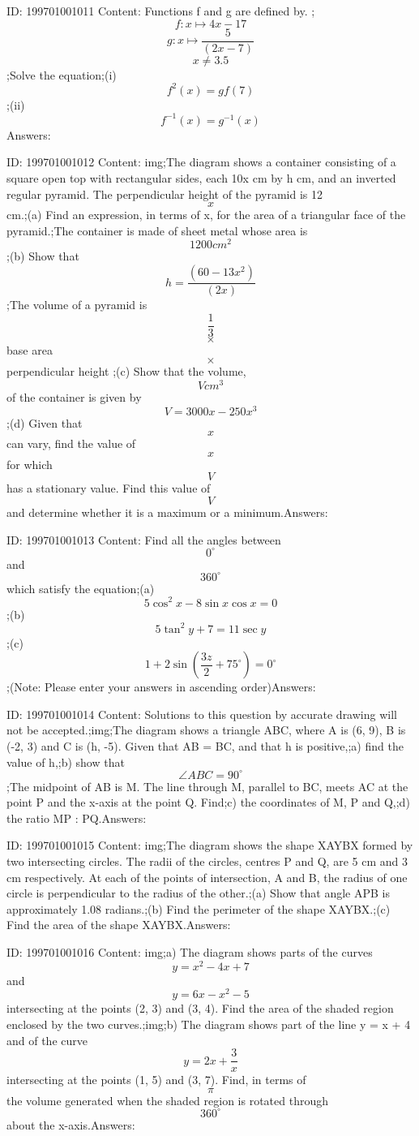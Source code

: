 \documentclass{article}
\begin{document}
ID: 199701001011
Content:
Functions f and g are defined by. ; \[f:x \mapsto  4x-17\] \[g:x \mapsto \frac{5}{(2x-7)} \] \[x\neq 3.5\];Solve the equation;(i) \[f^2(x)=gf(7)\];(ii) \[f^{-1}(x)=g^{-1}(x)\]Answers:

ID: 199701001012
Content:
img;The diagram shows a container consisting of a square open top with rectangular sides, each 10x cm by h cm, and an inverted regular pyramid. The perpendicular height of the pyramid is 12\[x\] cm.;(a)	Find an expression, in terms of x, for the area of a triangular face of the pyramid.;The container is made of sheet metal whose area is \[1200cm^2\];(b)	Show that  \[h=\frac{(60-13x^2)}{(2x)}\];The volume of a pyramid is \[\frac{1}{3}\] \[\times\] base area \[\times\] perpendicular height ;(c)	Show that the volume, \[V cm^3\] of the container is given by \[V=3000x-250x^3\];(d)	Given that \[x\] can vary, find the value of \[x\] for which \[V\] has a stationary value. Find this value of \[V\] and determine whether it is a maximum or a minimum.Answers:

ID: 199701001013
Content:
Find all the angles between \[0^{\circ}\] and \[360^{\circ}\]which satisfy the equation;(a) \[5\cos^2x-8\sin x\cos x=0\] ;(b) \[5\tan^2y+7=11\sec y\];(c) \[1+2\sin(\frac{3z}{2}+75^{\circ})=0^{\circ}\];(Note: Please enter your answers in ascending order)Answers:

ID: 199701001014
Content:
Solutions to this question by accurate drawing will not be accepted.;img;The diagram shows a triangle ABC, where A is (6, 9), B is (-2, 3) and C is (h, -5). Given that AB = BC, and that h is positive,;a)	find the value of h,;b)	show that \[ \angle ABC=90^{\circ}\];The midpoint of AB is M. The line through M, parallel to BC, meets AC at the point P and the x-axis at the point Q. Find;c)	the coordinates of M, P and Q,;d)	the ratio MP : PQ.Answers:

ID: 199701001015
Content:
img;The diagram shows the shape XAYBX formed by two intersecting circles. The radii of the circles, centres P and Q, are 5 cm and 3 cm respectively. At each of the points of intersection, A and B, the radius of one circle is perpendicular to the radius of the other.;(a)	Show that angle APB is approximately 1.08 radians.;(b)	Find the perimeter of the shape XAYBX.;(c)	Find the area of the shape XAYBX.Answers:

ID: 199701001016
Content:
img;a) The diagram shows parts of the curves \[y=x^2-4x+7\]  and \[y=6x-x^2-5\] intersecting at the points (2, 3) and (3, 4). Find the area of the shaded region enclosed by the two curves.;img;b) The diagram shows part of the line y = x + 4 and of the curve \[y=2x+\frac{3}{x}\] intersecting at the points (1, 5) and (3, 7). Find, in terms of \[\pi \] the volume generated when the shaded region is rotated through \[360^{\circ}\] about the x-axis.Answers:
\end{document}
